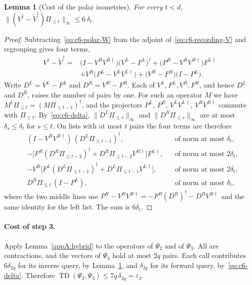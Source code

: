 \documentclass[11pt,letterpaper]{article}
\newtheorem{lemma}[theorem]{Lemma}
\theoremstyle{definition}\newtheorem{definition}[theorem]{Definition}
\newcommand{\TD}{\operatorname{TD}}
\newcommand{\norm}[1]{\lVert#1\rVert}
\begin{document}
\begin{lemma}[Cost of the polar isometries]\label{appA:polar}
For every $t<d$,
$\norm{(V^\dagger-\widetilde V^\dagger)\Pi_{\le t}}_\infty\le6\,\delta_t$.
\end{lemma}

\begin{proof}
Subtracting~\eqref{eq:c6-polar-W} from the adjoint
of~\eqref{eq:c6-recording-V} and regrouping gives four terms,
\begin{align*}
 V^\dagger-\widetilde V^\dagger
 ={}&\bigl(I-V^RV^{R\dagger}\bigr)\bigl(V^L-F^L\bigr)^\dagger
   +\bigl(P^R-V^RV^{R\dagger}\bigr)F^{L\dagger}\\
   &+V^R\bigl(P^L-V^LV^{L\dagger}\bigr)
   +\bigl(V^R-F^R\bigr)\bigl(I-P^L\bigr).
\end{align*}
Write $D^L=V^L-F^L$ and $D^R=V^R-F^R$. Each of
$V^L,F^L,V^R,F^R$, and hence $D^L$ and $D^R$, raises the number of
pairs by one. For such an operator $M$ we have
$M^\dagger\Pi_{\le t}=(M\Pi_{\le t-1})^\dagger$, and the projectors
$P^L$, $P^R$, $V^LV^{L\dagger}$, $V^RV^{R\dagger}$ commute with
$\Pi_{\le t}$. By~\eqref{eq:c6-delta}, $\norm{D^L\Pi_{\le s}}_\infty$
and $\norm{D^R\Pi_{\le s}}_\infty$ are at most $\delta_s\le\delta_t$ for
$s\le t$. On lists with at most $t$ pairs the four terms are therefore
\begin{align*}
 &(I-V^RV^{R\dagger})\,(D^L\Pi_{\le t-1})^\dagger,
   &&\text{of norm at most }\delta_t,\\
 &-\bigl[F^R(D^R\Pi_{\le t-2})^\dagger+D^R\Pi_{\le t-2}V^{R\dagger}\bigr]F^{L\dagger},
   &&\text{of norm at most }2\delta_t,\\
 &-V^R\bigl[F^L(D^L\Pi_{\le t-1})^\dagger+D^L\Pi_{\le t-1}V^{L\dagger}\bigr],
   &&\text{of norm at most }2\delta_t,\\
 &D^R\Pi_{\le t}\,(I-P^L), &&\text{of norm at most }\delta_t,
\end{align*}
where the two middle lines use
$P^R-V^RV^{R\dagger}=-F^R(D^R)^\dagger-D^RV^{R\dagger}$ and the same
identity for the left list. The sum is $6\delta_t$.
\end{proof}

\paragraph{Cost of step 3.}
Apply Lemma~\ref{appA:hybrid} to the operators of $\Psi_2$ and of
$\Psi_3$. All are contractions, and the vectors of $\Psi_3$ hold at
most $2q$ pairs. Each call contributes $6\delta_{2q}$ for its inverse
query, by Lemma~\ref{appA:polar}, and $\delta_{2q}$ for its forward
query, by~\eqref{eq:c6-delta}. Therefore
$\TD(\Psi_2,\Psi_3)\le7q\,\delta_{2q}=\varepsilon_3$.
\end{document}
